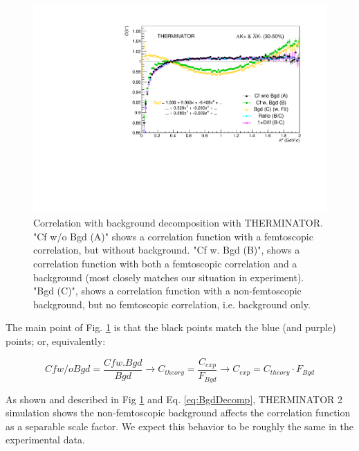 \documentclass[/home/jesse/Analysis/FemtoAnalysis/AnalysisNotes/AnalysisNoteJBuxton.tex]{subfiles}
\begin{document}
\begin{figure}[h]
  \centering
  \includegraphics[width=\textwidth]{5_Fitting/Figures/CompareBgds_Full_LamKchPwConj_3050.pdf}
  \caption[Correlation with background decomposition (THERM)]{Correlation with background decomposition with THERMINATOR.  "Cf w/o Bgd (A)" shows a correlation function with a femtoscopic correlation, but without background.  "Cf w. Bgd (B)", shows a correlation function with both a femtoscopic correlation and a background (most closely matches our situation in experiment).  "Bgd (C)", shows a correlation function with a non-femtoscopic background, but no femtoscopic correlation, i.e. background only.}
  \label{fig:THERMCfBgdDecomposition}
\end{figure}


The main point of Fig. \ref{fig:THERMCfBgdDecomposition} is that the black points match the blue (and purple) points; or, equivalently:

\begin{equation}
  Cf w/o Bgd = \dfrac{Cf w. Bgd}{Bgd} \to C_{theory} = \dfrac{C_{exp}}{F_{Bgd}} \to C_{exp} = C_{theory}\cdot F_{Bgd}
  \label{eq:BgdDecomp}
\end{equation}

As shown and described in Fig \ref{fig:THERMCfBgdDecomposition} and Eq. \ref{eq:BgdDecomp}, THERMINATOR 2 simulation shows the non-femtoscopic background affects the correlation function as a separable scale factor.  
We expect this behavior to be roughly the same in the experimental data.
\end{document}
